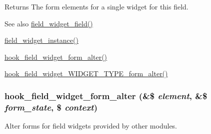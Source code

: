 \begin{DoxyReturn}{Returns}
The form elements for a single widget for this field.
\end{DoxyReturn}
\begin{DoxySeeAlso}{See also}
\hyperlink{field_8form_8inc_a71dcef632fc59641eee5238c7c6b335c}{field\_\-widget\_\-field()} 

\hyperlink{field_8form_8inc_ac72e1f5dacbab488a337f79fe485429f}{field\_\-widget\_\-instance()} 

\hyperlink{group__field__widget_gaca9d517ab0584fa2428779d8aa24a441}{hook\_\-field\_\-widget\_\-form\_\-alter()} 

\hyperlink{group__field__widget_ga6f53f1874a16e18c27dcc0cc4e7c1ec6}{hook\_\-field\_\-widget\_\-WIDGET\_\-TYPE\_\-form\_\-alter()} 
\end{DoxySeeAlso}
\hypertarget{group__field__widget_gaca9d517ab0584fa2428779d8aa24a441}{
\subsubsection[{hook\_\-field\_\-widget\_\-form\_\-alter}]{\setlength{\rightskip}{0pt plus 5cm}hook\_\-field\_\-widget\_\-form\_\-alter (\&\$ {\em element}, \/  \&\$ {\em form\_\-state}, \/  \$ {\em context})}}
\label{group__field__widget_gaca9d517ab0584fa2428779d8aa24a441}
Alter forms for field widgets provided by other modules.


